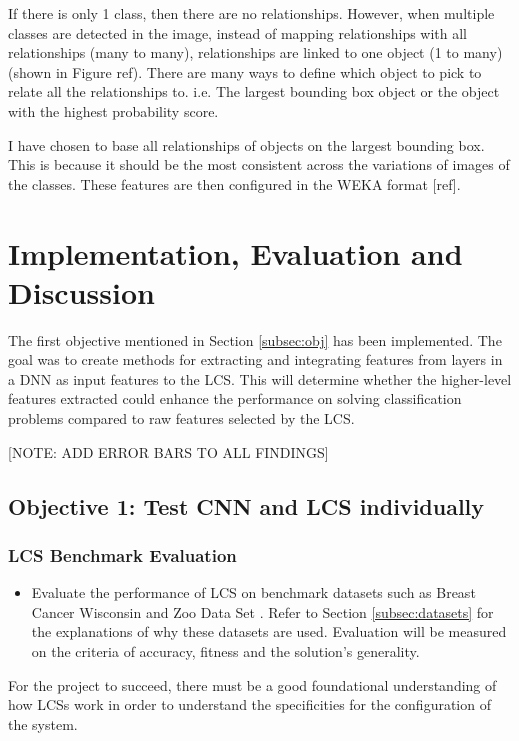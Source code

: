 If there is only 1 class, then there are no relationships. However, when multiple classes are detected in the image, instead of mapping relationships with all relationships (many to many), relationships are linked to one object (1 to many) (shown in Figure ref). There are many ways to define which object to pick to relate all the relationships to. i.e. The largest bounding box object or the object with the highest probability score. 

I have chosen to base all relationships of objects on the largest bounding box. This is because it should be the most consistent across the variations of images of the classes. These features are then configured in the WEKA format [ref]. 


\chapter{Implementation, Evaluation and Discussion}
The first objective mentioned in Section \ref{subsec:obj} has been implemented. The goal was to create methods for extracting and integrating features from layers in a DNN as input features to the LCS. This will determine whether the higher-level features extracted could enhance the performance on solving classification problems compared to raw features selected by the LCS. 

[NOTE: ADD ERROR BARS TO ALL FINDINGS]
\section{Objective 1: Test CNN and LCS individually}
\subsection{LCS Benchmark Evaluation} \label{subsec:bench}
\begin{itemize}
	\item Evaluate the performance of LCS on benchmark datasets such as Breast Cancer
	Wisconsin \cite{wisconsinbreast} and Zoo Data Set \cite{zoodata}. Refer to Section \ref{subsec:datasets} for the explanations of why these datasets are used. Evaluation will be measured on the criteria of
	accuracy, fitness and the solution’s generality.
\end{itemize}

For the project to succeed, there must be a good foundational understanding of how LCSs work in order to understand the specificities for the configuration of the system. 

